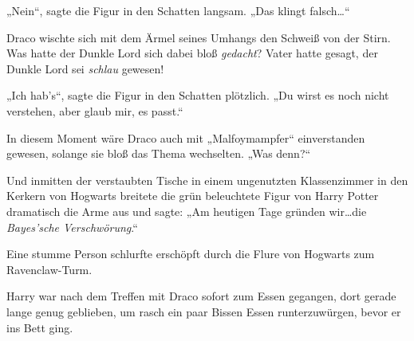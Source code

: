„Nein“, sagte die Figur in den Schatten langsam. „Das klingt falsch…“

Draco wischte sich mit dem Ärmel seines Umhangs den Schweiß von der Stirn. Was hatte der Dunkle Lord sich dabei bloß \emph{gedacht}? Vater hatte gesagt, der Dunkle Lord sei \emph{schlau} gewesen!

„Ich hab’s“, sagte die Figur in den Schatten plötzlich. „Du wirst es noch nicht verstehen, aber glaub mir, es passt.“

In diesem Moment wäre Draco auch mit „Malfoymampfer“ einverstanden gewesen, solange sie bloß das Thema wechselten. „Was denn?“

Und inmitten der verstaubten Tische in einem ungenutzten Klassenzimmer in den Kerkern von Hogwarts breitete die grün beleuchtete Figur von Harry Potter dramatisch die Arme aus und sagte: „Am heutigen Tage gründen wir…die \emph{Bayes’sche Verschwörung}.“

\later

Eine stumme Person schlurfte erschöpft durch die Flure von Hogwarts zum Ravenclaw-Turm.

Harry war nach dem Treffen mit Draco sofort zum Essen gegangen, dort gerade lange genug geblieben, um rasch ein paar Bissen Essen runterzuwürgen, bevor er ins Bett ging.


